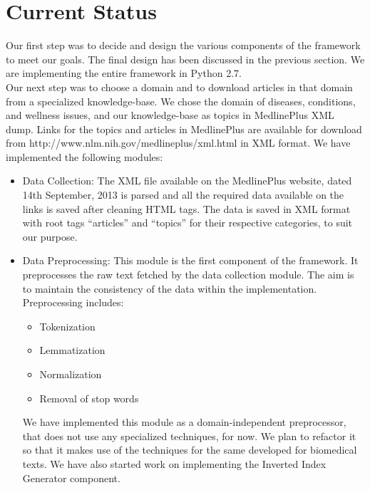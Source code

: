 \documentclass[journal,transmag]{IEEEtran}
\begin{document}

\section{\textbf{Current Status}}
Our first step was to decide and design the various components of the framework to meet our goals. The final design has been discussed in the previous section. We are implementing the entire framework in Python 2.7.\\
Our next step was to choose a domain and to download articles in that domain from a specialized knowledge-base. We chose the domain of diseases, conditions, and wellness issues, and our knowledge-base as topics in MedlinePlus XML dump. Links for the topics and articles in MedlinePlus are available for download from http://www.nlm.nih.gov/medlineplus/xml.html in XML format. We have implemented the following modules:
\begin{itemize}
\item Data Collection: The XML file available on the MedlinePlus website, dated 14th September, 2013 is parsed and all the required data available on the links is saved after cleaning HTML tags. The data is saved in XML format with root tags ``articles'' and ``topics'' for their respective categories, to suit our purpose.
\item Data Preprocessing: This module is the first component of the framework. It preprocesses the raw text fetched by the  data collection module. The aim is to maintain the consistency of the data within the implementation. Preprocessing includes:
\begin{itemize}
\item Tokenization
\item Lemmatization
\item Normalization
\item Removal of stop words
\end{itemize}
We have implemented this module as a domain-independent preprocessor, that does not use any specialized techniques, for now. We plan to refactor it so that it makes use of the techniques for the same developed for biomedical texts. We have also started work on implementing the Inverted Index Generator component.

\end{itemize}
\end{document}
